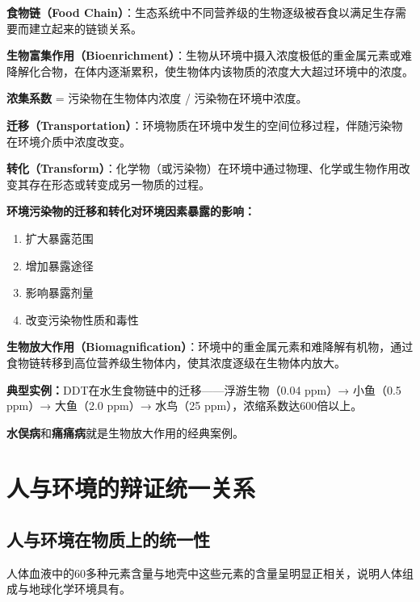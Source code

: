 \documentclass[10pt,a4paper,oneside]{ctexbook}
\begin{document}
\begin{defbox}
\textbf{食物链（Food Chain）}：生态系统中不同营养级的生物逐级被吞食以满足生存需要而建立起来的链锁关系。
\end{defbox}

\begin{defbox}
\textbf{生物富集作用（Bioenrichment）}：生物从环境中摄入浓度极低的重金属元素或难降解化合物，在体内逐渐累积，使生物体内该物质的浓度大大超过环境中的浓度。

\textbf{浓集系数} = 污染物在生物体内浓度 / 污染物在环境中浓度。
\end{defbox}

\begin{defbox}
\textbf{迁移（Transportation）}：环境物质在环境中发生的空间位移过程，伴随污染物在环境介质中浓度改变。

\textbf{转化（Transform）}：化学物（或污染物）在环境中通过物理、化学或生物作用改变其存在形态或转变成另一物质的过程。
\end{defbox}

\begin{keybox}
\textbf{环境污染物的迁移和转化对环境因素暴露的影响：}
\begin{enumerate}[leftmargin=*]
    \item 扩大暴露范围
    \item 增加暴露途径
    \item 影响暴露剂量
    \item 改变污染物性质和毒性
\end{enumerate}

\textbf{生物放大作用（Biomagnification）}：环境中的重金属元素和难降解有机物，通过食物链转移到高位营养级生物体内，使其浓度逐级在生物体内放大。

\textbf{典型实例：}DDT在水生食物链中的迁移——浮游生物（0.04 ppm）→ 小鱼（0.5 ppm）→ 大鱼（2.0 ppm）→ 水鸟（25 ppm），浓缩系数达600倍以上。

\textbf{水俣病}和\textbf{痛痛病}就是生物放大作用的经典案例。
\end{keybox}

\section{人与环境的辩证统一关系}

\subsection{人与环境在物质上的统一性}
人体血液中的60多种元素含量与地壳中这些元素的含量呈明显正相关，说明人体组成与地球化学环境具有。
\end{document}

